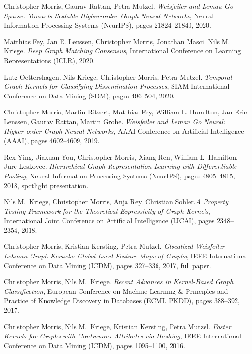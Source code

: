 \documentclass[11pt, a4paper, DIV=14, headings=small]{scrartcl}
\begin{document}
\begin{thebibliography}{15}
		Christopher Morris, Gaurav Rattan, Petra Mutzel.
		\emph{Weisfeiler and Leman Go Sparse: Towards Scalable Higher-order Graph Neural Networks},
		Neural Information Processing Systems (NeurIPS), pages 21824--21840, 2020.
		
		Matthias Fey, Jan E. Lenssen, Christopher Morris, Jonathan Masci, Nils M. Kriege.
		\emph{Deep Graph Matching Consensus},
		International Conference on Learning Representations (ICLR), 2020.
		
		Lutz Oettershagen, Nils Kriege, Christopher Morris, Petra Mutzel.
		\emph{Temporal Graph Kernels for Classifying Dissemination Processes},
		SIAM International Conference on Data Mining (SDM), pages 496--504, 2020.
		
		Christopher Morris, Martin Ritzert, Matthias Fey, William L. Hamilton, Jan Eric Lenssen, Gaurav Rattan, Martin Grohe.
		\newblock \emph{Weisfeiler and Leman Go Neural: Higher-order Graph Neural Networks},
		\newblock AAAI Conference on Artificial Intelligence (AAAI), pages 4602--4609, 2019.
		
		Rex Ying, Jiaxuan You, Christopher Morris, Xiang Ren, William L. Hamilton, Jure Leskovec.
		\emph{Hierarchical Graph Representation Learning with Differentiable Pooling},
		Neural Information Processing Systems (NeurIPS), pages 4805--4815, 2018, spotlight presentation.
		
		Nils M.~Kriege, Christopher Morris, Anja Rey, Christian Sohler.\footnotemark[2]
		\emph{A Property Testing Framework for the Theoretical Expressivity of Graph Kernels},
		International Joint Conference on Artificial Intelligence (IJCAI), pages 2348--2354, 2018.
		
		Christopher Morris, Kristian Kersting, Petra Mutzel.
		\emph{Glocalized Weisfeiler-Lehman Graph Kernels: Global-Local Feature Maps of Graphs},
		IEEE International Conference on Data Mining (ICDM), pages 327--336, 2017, full paper.
		
		Christopher Morris, Nils M.~Kriege.
		\emph{Recent Advances in Kernel-Based Graph Classification},
		European Conference on Machine Learning \& Principles and Practice of Knowledge Discovery in Databases (ECML PKDD), pages 388--392, 2017.
		
		Christopher Morris, Nils M.~Kriege, Kristian Kersting, Petra Mutzel.
		\emph{Faster Kernels for Graphs with Continuous Attributes via Hashing},
		IEEE International Conference on Data Mining (ICDM), pages 1095--1100, 2016.
		

\end{thebibliography}
\end{document}
